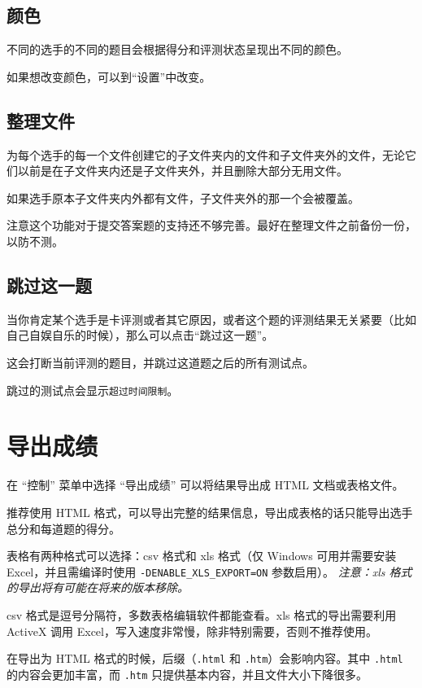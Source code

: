 \documentclass[UTF-8]{ctexart}
\begin{document}
		\subsection{颜色}

			不同的选手的不同的题目会根据得分和评测状态呈现出不同的颜色。

			如果想改变颜色，可以到“设置”中改变。

		\subsection{整理文件}

			为每个选手的每一个文件创建它的子文件夹内的文件和子文件夹外的文件，无论它们以前是在子文件夹内还是子文件夹外，并且删除大部分无用文件。

			如果选手原本子文件夹内外都有文件，子文件夹外的那一个会被覆盖。

			注意这个功能对于提交答案题的支持还不够完善。最好在整理文件之前备份一份，以防不测。

		\subsection{跳过这一题}

			当你肯定某个选手是卡评测或者其它原因，或者这个题的评测结果无关紧要（比如自己自娱自乐的时候），那么可以点击“跳过这一题”。

			这会打断当前评测的题目，并跳过这道题之后的所有测试点。

			跳过的测试点会显示\texttt{超过时间限制}。

	\newpage

	\section{导出成绩}

		在 “控制” 菜单中选择 “导出成绩” 可以将结果导出成 HTML 文档或表格文件。

		推荐使用 HTML 格式，可以导出完整的结果信息，导出成表格的话只能导出选手总分和每道题的得分。

		表格有两种格式可以选择：csv 格式和 xls 格式（仅 Windows 可用并需要安装 Excel，并且需编译时使用 \verb|-DENABLE_XLS_EXPORT=ON| 参数启用）。 \emph{注意：xls 格式的导出将有可能在将来的版本移除。}

		csv 格式是逗号分隔符，多数表格编辑软件都能查看。xls 格式的导出需要利用 ActiveX 调用 Excel，写入速度非常慢，除非特别需要，否则不推荐使用。

		在导出为 HTML 格式的时候，后缀（\texttt{.html} 和 \texttt{.htm}）会影响内容。其中 \texttt{.html} 的内容会更加丰富，而 \texttt{.htm} 只提供基本内容，并且文件大小下降很多。
\end{document}
